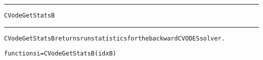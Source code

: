 \begin{samepage}
\hrule
\begin{center}
{\large \verb!CVodeGetStatsB!}
\label{p:CVodeGetStatsB}
\end{center}
\hrule\vspace{0.1in}



\begin{alltt}
CVodeGetStatsB returns run statistics for the backward CVODES solver.
\end{alltt}

\end{samepage}



\begin{samepage}


\begin{alltt}
function si = CVodeGetStatsB(idxB) 
\end{alltt}

\end{samepage}



